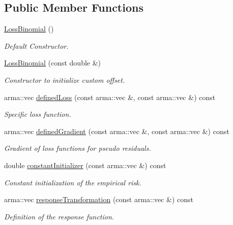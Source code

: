 \subsection*{Public Member Functions}
\begin{DoxyCompactItemize}
\item 
\hyperlink{classloss_1_1_loss_binomial_ab1d025ad170fc10db1469cccaf8d877d}{Loss\+Binomial} ()
\begin{DoxyCompactList}\small\item\em Default Constructor. \end{DoxyCompactList}\item 
\hyperlink{classloss_1_1_loss_binomial_a16c4400af5c790a56ac0e0fcb7d1c5c5}{Loss\+Binomial} (const double \&)
\begin{DoxyCompactList}\small\item\em Constructor to initialize custom offset. \end{DoxyCompactList}\item 
arma\+::vec \hyperlink{classloss_1_1_loss_binomial_a396a06f762b735f83af21bdd4ba8fe9c}{defined\+Loss} (const arma\+::vec \&, const arma\+::vec \&) const
\begin{DoxyCompactList}\small\item\em Specific loss function. \end{DoxyCompactList}\item 
arma\+::vec \hyperlink{classloss_1_1_loss_binomial_a68dcf02e90d09c3658733a9319a85f56}{defined\+Gradient} (const arma\+::vec \&, const arma\+::vec \&) const
\begin{DoxyCompactList}\small\item\em Gradient of loss functions for pseudo residuals. \end{DoxyCompactList}\item 
double \hyperlink{classloss_1_1_loss_binomial_a21c384401aa0ef9b2db379e6822c3570}{constant\+Initializer} (const arma\+::vec \&) const
\begin{DoxyCompactList}\small\item\em Constant initialization of the empirical risk. \end{DoxyCompactList}\item 
arma\+::vec \hyperlink{classloss_1_1_loss_binomial_a757fd8d478732ce94e8ba9497846bcf4}{response\+Transformation} (const arma\+::vec \&) const
\begin{DoxyCompactList}\small\item\em Definition of the response function. \end{DoxyCompactList}\end{DoxyCompactItemize}
